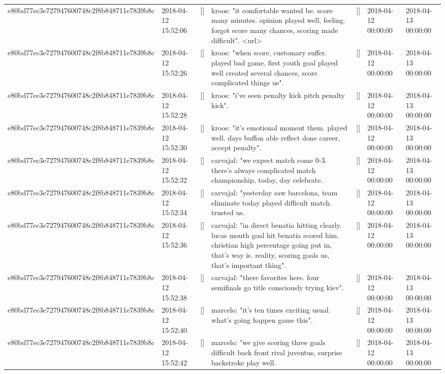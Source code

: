 \begin{tabular}{lllllll}
e80bd77ec3e727947600748c2f8b848711e7839b8c & 2018-04-12 15:52:06 & [] & kroos: "it comfortable wanted be. score many minutes. opinion played well, feeling. forgot score many chances, scoring made difficult". <url> & [] & 2018-04-12 00:00:00 & 2018-04-13 00:00:00 \\
e80bd77ec3e727947600748c2f8b848711e7839b8c & 2018-04-12 15:52:26 & [] & kroos: "when score, customary suffer. played bad game. first youth goal played well created several chances, score complicated things us". & [] & 2018-04-12 00:00:00 & 2018-04-13 00:00:00 \\
e80bd77ec3e727947600748c2f8b848711e7839b8c & 2018-04-12 15:52:28 & [] & kroos: "i've seen penalty kick pitch penalty kick". & [] & 2018-04-12 00:00:00 & 2018-04-13 00:00:00 \\
e80bd77ec3e727947600748c2f8b848711e7839b8c & 2018-04-12 15:52:30 & [] & kroos: "it's emotional moment them. played well. days buffon able reflect done career, accept penalty". & [] & 2018-04-12 00:00:00 & 2018-04-13 00:00:00 \\
e80bd77ec3e727947600748c2f8b848711e7839b8c & 2018-04-12 15:52:32 & [] & carvajal: "we expect match come 0-3. there's always complicated match championship, today, day celebrate. & [] & 2018-04-12 00:00:00 & 2018-04-13 00:00:00 \\
e80bd77ec3e727947600748c2f8b848711e7839b8c & 2018-04-12 15:52:34 & [] & carvajal: "yesterday saw barcelona, team eliminate today played difficult match. trusted us. & [] & 2018-04-12 00:00:00 & 2018-04-13 00:00:00 \\
e80bd77ec3e727947600748c2f8b848711e7839b8c & 2018-04-12 15:52:36 & [] & carvajal: "in direct benatia hitting clearly. lucas mouth goal hit benatia scored him. christian high percentage going put in, that's way is. reality, scoring goals us, that's important thing". & [] & 2018-04-12 00:00:00 & 2018-04-13 00:00:00 \\
e80bd77ec3e727947600748c2f8b848711e7839b8c & 2018-04-12 15:52:38 & [] & carvajal: "there favorites here. four semifinals go title consciously trying kiev". & [] & 2018-04-12 00:00:00 & 2018-04-13 00:00:00 \\
e80bd77ec3e727947600748c2f8b848711e7839b8c & 2018-04-12 15:52:40 & [] & marcelo: "it's ten times exciting usual. what's going happen game this". & [] & 2018-04-12 00:00:00 & 2018-04-13 00:00:00 \\
e80bd77ec3e727947600748c2f8b848711e7839b8c & 2018-04-12 15:52:42 & [] & marcelo: "we give scoring three goals difficult back front rival juventus, surprise backstroke play well. & [] & 2018-04-12 00:00:00 & 2018-04-13 00:00:00 \\

\end{tabular}
